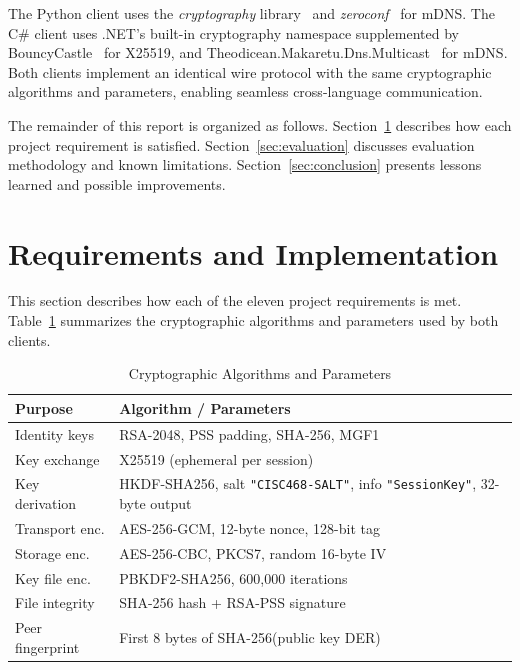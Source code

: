 \documentclass[sigconf,nonacm]{acmart}
\begin{document}
The Python client uses the \emph{cryptography} library~\cite{pyca} and \emph{zeroconf}~\cite{zeroconf} for mDNS.
The C\# client uses .NET's built-in cryptography namespace supplemented by BouncyCastle~\cite{bouncycastle} for X25519, and Theodicean.Makaretu.Dns.Multicast~\cite{Theodicean} for mDNS.
Both clients implement an identical wire protocol with the same cryptographic algorithms and parameters, enabling seamless cross-language communication.

The remainder of this report is organized as follows.
Section~\ref{sec:requirements} describes how each project requirement is satisfied.
Section~\ref{sec:evaluation} discusses evaluation methodology and known limitations.
Section~\ref{sec:conclusion} presents lessons learned and possible improvements.


\section{Requirements and Implementation}
\label{sec:requirements}

This section describes how each of the eleven project requirements is met.
Table~\ref{tab:crypto} summarizes the cryptographic algorithms and parameters used by both clients.

\begin{table}
  \caption{Cryptographic Algorithms and Parameters}
  \label{tab:crypto}
  \begin{tabular}{p{2.1cm}p{5.5cm}}
    \toprule
    Purpose & Algorithm / Parameters \\
    \midrule
    Identity keys & RSA-2048, PSS padding, SHA-256, MGF1 \\
    Key exchange & X25519 (ephemeral per session) \\
    Key derivation & HKDF-SHA256, salt \texttt{"CISC468-SALT"}, info \texttt{"SessionKey"}, 32-byte output \\
    Transport enc. & AES-256-GCM, 12-byte nonce, 128-bit tag \\
    Storage enc. & AES-256-CBC, PKCS7, random 16-byte IV \\
    Key file enc. & PBKDF2-SHA256, 600{,}000 iterations \\
    File integrity & SHA-256 hash + RSA-PSS signature \\
    Peer fingerprint & First 8 bytes of SHA-256(public key DER) \\
    \bottomrule
  \end{tabular}
\end{table}
\end{document}
